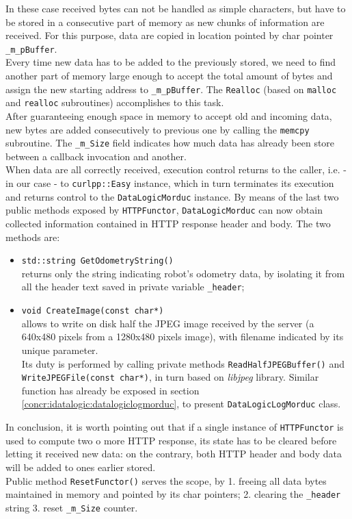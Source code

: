 In these case received bytes can not be handled as simple characters,
but have to be stored in a consecutive part of memory as new chunks
of information are received. For this purpose, data are copied in location
pointed by char pointer \texttt{\_m\_pBuffer}.
\\
Every time new data has to be added to the previously stored, we need
to find another part of memory large enough to accept the total amount of
bytes and assign the new starting address to \texttt{\_m\_pBuffer}. The
\texttt{Realloc} (based on \texttt{malloc} and \texttt{realloc} subroutines)
accomplishes to this task.
\\
After guaranteeing enough space in memory to accept old and incoming data,
new bytes
are added consecutively to previous one by calling the \texttt{memcpy}
subroutine. The \texttt{\_m\_Size} field indicates how much data
has already been store between a callback invocation and another.
\\
When data are all correctly received, execution control returns to the
caller, i.e. - in our case - to \texttt{curlpp::Easy} instance, which
in turn terminates its execution and returns control to the
\texttt{DataLogicMorduc} instance. By means
of the last two public methods exposed by \texttt{HTTPFunctor},
\texttt{DataLogicMorduc}
can now obtain collected information contained in HTTP response header and
body. The two methods are:

\begin{itemize}

  \item \texttt{std::string GetOdometryString()} \\
    returns only the string indicating robot's odometry data,
    by isolating it from all the header text saved in private
    variable \texttt{\_header};

  \item \texttt{void CreateImage(const char*)} \\
    allows to write on disk half the JPEG image received
    by the server (a 640x480 pixels from a 1280x480 pixels image), with
    filename indicated by its unique parameter. \\
    Its duty is performed by calling private methods
    \texttt{ReadHalfJPEGBuffer()} and \texttt{WriteJPEGFile(const char*)},
    in turn based on \textit{libjpeg} library. Similar function has
    already be exposed in section \ref{concr:idatalogic:datalogiclogmorduc},
    to present \texttt{DataLogicLogMorduc} class.

\end{itemize}

In conclusion, it is worth pointing out that if a single instance of
\texttt{HTTPFunctor} is used to compute two o more HTTP response,
its state has to be cleared before letting it received new data: on the contrary,
both HTTP header and body data will be added to ones earlier stored.
\\
Public method \texttt{ResetFunctor()} serves the scope, by 1. freeing all
data bytes maintained in memory and pointed by its char pointers; 2. clearing the
\texttt{\_header} string 3. reset \texttt{\_m\_Size} counter.

